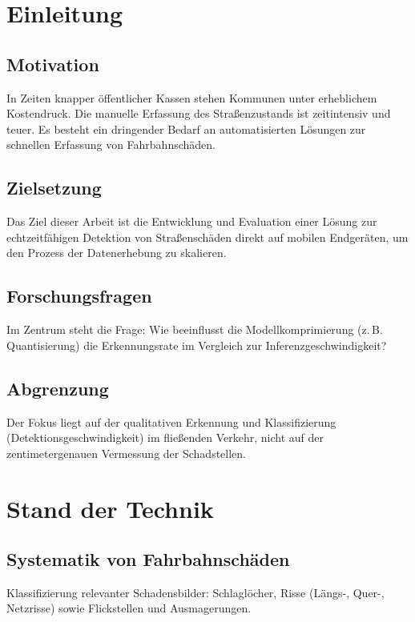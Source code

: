 \documentclass[fontsize=13pt,a4paper, listof=entryprefix, bibliography=totocnumbered,toc=listofnumbered]{scrartcl}
\begin{document}

\section{Einleitung}
\label{sec:einleitung}

\subsection{Motivation}
In Zeiten knapper öffentlicher Kassen stehen Kommunen unter erheblichem Kostendruck. Die manuelle Erfassung des Straßenzustands ist zeitintensiv und teuer. Es besteht ein dringender Bedarf an automatisierten Lösungen zur schnellen Erfassung von Fahrbahnschäden.

\subsection{Zielsetzung}
Das Ziel dieser Arbeit ist die Entwicklung und Evaluation einer Lösung zur echtzeitfähigen Detektion von Straßenschäden direkt auf mobilen Endgeräten, um den Prozess der Datenerhebung zu skalieren.

\subsection{Forschungsfragen}
Im Zentrum steht die Frage: Wie beeinflusst die Modellkomprimierung (z.\,B. Quantisierung) die Erkennungsrate im Vergleich zur Inferenzgeschwindigkeit?

\subsection{Abgrenzung}
Der Fokus liegt auf der qualitativen Erkennung und Klassifizierung (Detektionsgeschwindigkeit) im fließenden Verkehr, nicht auf der zentimetergenauen Vermessung der Schadstellen.

\section{Stand der Technik}
\label{sec:stand_der_technik}

\subsection{Systematik von Fahrbahnschäden}
Klassifizierung relevanter Schadensbilder: Schlaglöcher, Risse (Längs-, Quer-, Netzrisse) sowie Flickstellen und Ausmagerungen.
\end{document}
